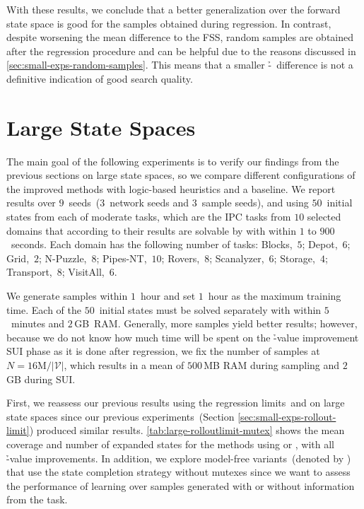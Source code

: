 With these results, we conclude that a better generalization over the forward state space is good for the samples obtained during regression. In contrast, despite worsening the mean difference to the FSS, random samples are obtained after the regression procedure and can be helpful due to the reasons discussed in \cref{sec:small-exps-random-samples}. This means that a smaller \mbox{\h-\hstar}~difference is not a definitive indication of good search quality.

\section{Large State Spaces}
\label{sec:large-experiments}

The main goal of the following experiments is to verify our findings from the previous sections on large state spaces, so we compare different configurations of the improved methods with logic-based heuristics and a baseline. We report results over $9$~seeds~($3$~network seeds and $3$~sample seeds), and using $50$~initial states from each of \citet{ferber2022neural} moderate tasks, which are the IPC tasks from $10$ selected domains that according to their results are solvable by \gbfs with \hff within $1$ to $900$~seconds. Each domain has the following number of tasks: Blocks,~$5$; Depot,~$6$; Grid,~$2$; N-Puzzle,~$8$; Pipes-NT,~$10$; Rovers,~$8$; Scanalyzer,~$6$; Storage,~$4$; Transport,~$8$; VisitAll,~$6$.

We generate samples within $1$~hour and set $1$~hour as the maximum training time. Each of the $50$~initial states must be solved separately with \gbfs within $5$~minutes and $2$\,GB~RAM. Generally, more samples yield better results; however, because we do not know how much time will be spent on the \h-value improvement SUI phase as it is done after regression, we fix the number of samples at $N = 16\text{M} / |\mathcal{V}|$, which results in a mean of $500$\,MB RAM during sampling and $2$\,GB during SUI.

First, we reassess our previous results using the regression limits~\rlfacts and \rlmeanfx on large state spaces since our previous experiments~(Section \ref{sec:small-exps-rollout-limit}) produced similar results. \cref{tab:large-rolloutlimit-mutex} shows the mean coverage and number of expanded states for the methods using \rlfacts or \rlmeanfx, with all \h-value improvements. In addition, we explore model-free variants~(denoted by \hnnnomutex) that use the state completion strategy without mutexes since we want to assess the performance of learning over samples generated with or without information from the task.

